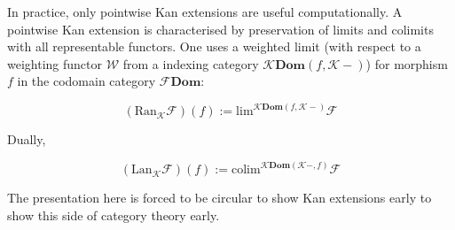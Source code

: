 \documentclass[10pt]{amsbook}
\theoremstyle{definition}
\theoremstyle{remark}
\numberwithin{section}{chapter}
\numberwithin{equation}{chapter}
\begin{document}
In practice, only pointwise Kan extensions are useful computationally. A pointwise Kan extension is characterised by preservation of limits and colimits with all representable functors. One uses a weighted limit (with respect to a weighting functor $\mathcal{W}$ from a indexing category $\mathcal{K} \mathbf{Dom}(f, \mathcal{K}-)$) for morphism $f$ in the codomain category $\mathcal{F} \mathbf{Dom}$:

\begin{equation}
    (\mathrm{Ran}_\mathcal{K} \mathcal{F})(f)
    :=
    \mathrm{lim}^{\mathcal{K} \mathbf{Dom}(f, \mathcal{K}-)} \mathcal{F}
\end{equation}

Dually,

\begin{equation}
    (\mathrm{Lan}_\mathcal{K} \mathcal{F})(f)
    :=
    \mathrm{colim}^{\mathcal{K} \mathbf{Dom}(\mathcal{K}-, f)} \mathcal{F}
\end{equation}

The presentation here is forced to be circular to show Kan extensions early to show this side of category theory early.

\appendix
%    

\backmatter


\printindex
\end{document}
